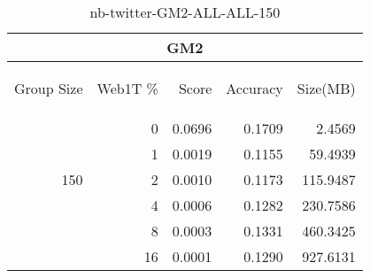 \begin{center}
\begin{table}[htbp]
\begin{tabular}{ | r | r | r | r | r |}
\hline
\multicolumn{5}{|c|}{GM2}\\
\hline
\begin{sideways}Group Size\end{sideways} & \begin{sideways}Web1T \%\end{sideways} & \begin{sideways}Score\end{sideways} & \begin{sideways}Accuracy\end{sideways} & \begin{sideways}Size(MB)\end{sideways}\\
\hline
\multirow{5}{*}{150}
 & 0 & 0.0696 & 0.1709 & 2.4569\\ \cline{2-5}
 & 1 & 0.0019 & 0.1155 & 59.4939\\ \cline{2-5}
 & 2 & 0.0010 & 0.1173 & 115.9487\\ \cline{2-5}
 & 4 & 0.0006 & 0.1282 & 230.7586\\ \cline{2-5}
 & 8 & 0.0003 & 0.1331 & 460.3425\\ \cline{2-5}
 & 16 & 0.0001 & 0.1290 & 927.6131\\ \cline{2-5}
\hline
\end{tabular}
\caption{nb-twitter-GM2-ALL-ALL-150}
\label{table:nb-twitter-GM2-ALL-ALL-150}
\end{table}
\end{center}

